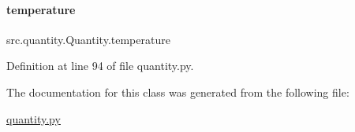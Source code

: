 \paragraph{\texorpdfstring{temperature}{temperature}}
{\footnotesize\ttfamily src.\+quantity.\+Quantity.\+temperature\hspace{0.3cm}{\ttfamily [inherited]}}



Definition at line 94 of file quantity.\+py.



The documentation for this class was generated from the following file\+:\begin{DoxyCompactItemize}
\item 
\hyperlink{quantity_8py}{quantity.\+py}\end{DoxyCompactItemize}
